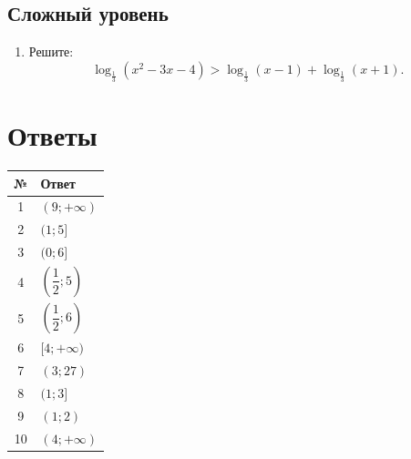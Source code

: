 \documentclass[a4paper,12pt]{article}
\begin{document}
\subsection*{Сложный уровень}
\begin{enumerate}[resume]
\item Решите:
\[
\log_{\frac13}(x^2-3x-4)>
\log_{\frac13}(x-1)+\log_{\frac13}(x+1).
\]
\end{enumerate}

\clearpage
\section*{Ответы}
\renewcommand{\arraystretch}{1.45}
\begin{longtable}{@{}cl@{}}
\toprule
№ & Ответ \\
\midrule
1 & $(9;+\infty)$ \\
2 & $(1;5]$ \\
3 & $(0;6]$ \\
4 & $\left(\dfrac12;5\right)$ \\
5 & $\left(\dfrac12;6\right)$ \\
6 & $[4;+\infty)$ \\
7 & $(3;27)$ \\
8 & $(1;3]$ \\
9 & $(1;2)$ \\
10 & $(4;+\infty)$ \\
\bottomrule
\end{longtable}
\end{document}

